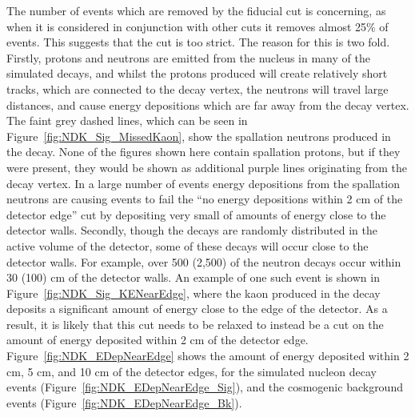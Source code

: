The number of events which are removed by the fiducial cut is concerning, as when it is considered in conjunction with other cuts it removes almost 25\% of events. This suggests that the cut is too strict. The reason for this is two fold. Firstly, protons and neutrons are emitted from the nucleus in many of the simulated decays, and whilst the protons produced will create relatively short tracks, which are connected to the decay vertex, the neutrons will travel large distances, and cause energy depositions which are far away from the decay vertex. The faint grey dashed lines, which can be seen in Figure~\ref{fig:NDK_Sig_MissedKaon}, show the spallation neutrons produced in the decay. None of the figures shown here contain spallation protons, but if they were present, they would be shown as additional purple lines originating from the decay vertex. In a large number of events energy depositions from the spallation neutrons are causing events to fail the ``no energy depositions within 2 cm of the detector edge'' cut by depositing very small of amounts of energy close to the detector walls. Secondly, though the decays are randomly distributed in the active volume of the detector, some of these decays will occur close to the detector walls. For example, over 500 (2,500) of the neutron decays occur within 30 (100) cm of the detector walls. An example of one such event is shown in Figure~\ref{fig:NDK_Sig_KENearEdge}, where the kaon produced in the decay deposits a significant amount of energy close to the edge of the detector. As a result, it is likely that this cut needs to be relaxed to instead be a cut on the amount of energy deposited within 2 cm of the detector edge. Figure~\ref{fig:NDK_EDepNearEdge} shows the amount of energy deposited within 2 cm, 5 cm, and 10 cm of the detector edges, for the simulated nucleon decay events (Figure~\ref{fig:NDK_EDepNearEdge_Sig}), and the cosmogenic background events (Figure~\ref{fig:NDK_EDepNearEdge_Bk}). \\ 

